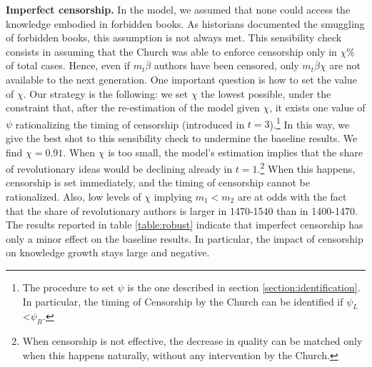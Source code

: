 \textbf{Imperfect censorship.} In the model, we assumed that none could access the knowledge embodied in forbidden books. As historians \cite{grendler1975} documented the smuggling of forbidden books, this assumption is not always met. This sensibility check consists in assuming that the Church was able to enforce censorship only in $\chi\%$ of total cases. Hence, even if $m_t\overline{\beta}$ authors have been censored, only  $m_t\overline{\beta}\chi$ are not available to the next generation. One important question is how to set the value of $\chi$. Our strategy is the following: we set $\chi$ the lowest possible, under the constraint that, after the re-estimation of the model given $\chi$, it exists one value of $\psi$ rationalizing the timing of censorship (introduced in $t=3$).\footnote{The procedure to set $\psi$ is the one described in section \ref{section:identification}. In particular, the timing of Censorship by the Church can be identified if $\psi_L$<$\psi_R$.} In this way, we give the best shot to this sensibility check to undermine the baseline results. We find $\chi=0.91$. When $\chi$ is too small, the model's estimation implies that the share of revolutionary ideas would be declining already in $t=1$.\footnote{When censorship is not effective, the decrease in quality can be matched only when this happens naturally, without any intervention by the Church.} When this happens, censorship is set immediately, and the timing of censorship cannot be rationalized. Also, low levels of $\chi$ implying $m_1<m_2$ are at odds with the fact that the share of revolutionary authors is larger in 1470-1540 than in 1400-1470. The results reported in table \ref{table:robust} indicate that imperfect censorship has only a minor effect on the baseline results. In particular, the impact of censorship on knowledge growth stays large and negative.



